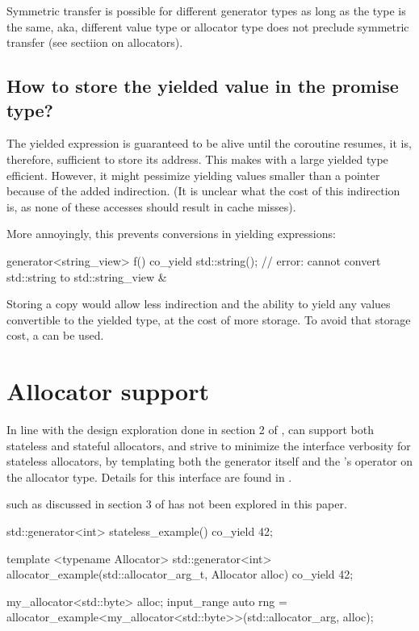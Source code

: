 \documentclass{wg21}
\begin{document}
Symmetric transfer is possible for different generator types as long as the  type is the same, aka,
different value type or allocator type does not preclude symmetric transfer (see sectiion on allocators).

\subsection{How to store the yielded value in the promise type?}

The yielded expression is guaranteed to be alive until the coroutine resumes, it is, therefore, sufficient to store
its address. 
This makes  with a large yielded type efficient.
However, it might pessimize yielding values smaller than a pointer because of the added indirection.
(It is unclear what the cost of this indirection is, as none of these accesses should result in cache misses).

More annoyingly, this prevents conversions in yielding expressions:

\begin{colorblock}
    generator<string_view> f() {
        co_yield std::string(); // error: cannot convert std::string to std::string_view \&
    }
\end{colorblock}

Storing a copy would allow less indirection and the ability to yield any values convertible to the yielded type,
at the cost of more storage.
To avoid that storage cost, a  can be used.


\section{Allocator support}

In line with the design exploration done in section 2 of ,  can support both stateless and stateful allocators, and strive
to minimize the interface verbosity for stateless allocators, by templating both the generator itself and the 's  operator
on the allocator type. Details for this interface are found in .

 such as discussed in section 3 of  has not been explored in this paper.

\begin{colorblock}
    std::generator<int> stateless_example() {
        co_yield 42;
    }
    
    template <typename Allocator>
    std::generator<int> 
    allocator_example(std::allocator_arg_t, Allocator alloc) {
        co_yield 42;
    }
    
    my_allocator<std::byte> alloc;
    input_range auto rng = allocator_example<my_allocator<std::byte>>(std::allocator_arg, alloc);
    
\end{colorblock}
\end{document}

